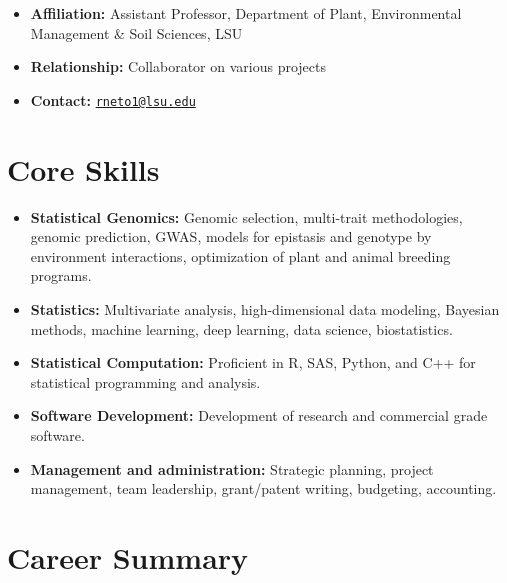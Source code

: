 \documentclass[11pt,a4paper,]{moderncv}
\providecommand{\tightlist}{%
	\setlength{\itemsep}{0pt}\setlength{\parskip}{0pt}}
\begin{document}
\begin{itemize}
  \begin{itemize}
  \tightlist
  \item
    \textbf{Affiliation:} Assistant Professor, Department of Plant,
    Environmental Management \& Soil Sciences, LSU
  \item
    \textbf{Relationship:} Collaborator on various projects
  \item
    \textbf{Contact:}
    \href{mailto:rneto1@lsu.edu}{\nolinkurl{rneto1@lsu.edu}}
  \end{itemize}
\end{itemize}

\section{Core Skills}\label{core-skills-1}

\begin{itemize}
\tightlist
\item
  \textbf{Statistical Genomics:} Genomic selection, multi-trait
  methodologies, genomic prediction, GWAS, models for epistasis and
  genotype by environment interactions, optimization of plant and animal
  breeding programs.
\item
  \textbf{Statistics:} Multivariate analysis, high-dimensional data
  modeling, Bayesian methods, machine learning, deep learning, data
  science, biostatistics.
\item
  \textbf{Statistical Computation:} Proficient in R, SAS, Python, and
  C++ for statistical programming and analysis.
\item
  \textbf{Software Development:} Development of research and commercial
  grade software.
\item
  \textbf{Management and administration:} Strategic planning, project
  management, team leadership, grant/patent writing, budgeting,
  accounting.
\end{itemize}

\section{Career Summary}\label{career-summary-1}
\end{document}
